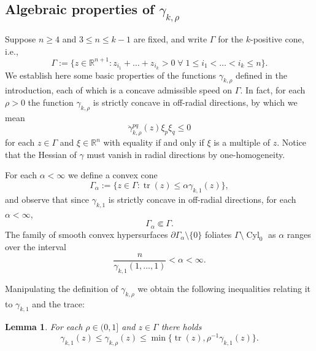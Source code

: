 \documentclass[12pt]{amsart}
\newtheorem{lemma}[theorem]{Lemma}
\DeclareMathOperator{\tr}{tr}
\DeclareMathOperator{\Cyl}{Cyl}
\begin{document}
\subsection{Algebraic properties of $\gamma_{k,\rho}$}
 
Suppose $n \geq 4$ and $3 \leq n \leq k-1$ are fixed, and write $\Gamma$ for the $k$-positive cone, i.e.,
\[\Gamma := \{ z \in \mathbb{R}^{n+1} :  z_{i_1} + \dots +z_{i_k} >0 \; \forall \; {1 \leq i_1 < \dots < i_k \leq n} \}.\]
We establish here some basic properties of the functions $\gamma_{k,\rho}$ defined in the introduction, each of which is a concave admissible speed on $\Gamma$. In fact, for each $\rho >0$ the function $\gamma_{k,\rho}$ is strictly concave in off-radial directions, by which we mean
\[\ddot \gamma_{k,\rho}^{pq}(z) \xi_p \xi_q \leq 0\]
for each $z \in \Gamma$ and $\xi \in \mathbb{R}^n$ with equality if and only if $\xi$ is a multiple of $z$. Notice that the Hessian of $\gamma$ must vanish in radial directions by one-homogeneity. 

For each $\alpha < \infty$ we define a convex cone 
\[\Gamma_\alpha:= \{z \in \Gamma: \tr(z) \leq \alpha \gamma_{k,1}(z)\},\]
and observe that since $\gamma_{k,1}$ is strictly concave in off-radial directions, for each $\alpha< \infty$,
\[\Gamma_\alpha \Subset \Gamma.\]
The family of smooth convex hypersurfaces $\partial \Gamma_\alpha\setminus\{0\}$ foliates $\Gamma \setminus \Cyl_0$ as $\alpha$ ranges over the interval
\[ \frac{n}{\gamma_{k,1}(1,\dots,1)}<\alpha< \infty.\]

Manipulating the definition of $\gamma_{k,\rho}$ we obtain the following inequalities relating it to $\gamma_{k,1}$ and the trace:
\begin{lemma}
\label{lem:zeroth-order_ests}
For each $\rho \in (0,1]$ and $z \in \Gamma$ there holds
\[\gamma_{k,1}(z) \leq \gamma_{k,\rho} (z) \leq \min\{\tr(z), \rho^{-1} \gamma_{k,1}(z)\}.\]
\end{lemma}
\end{document}
